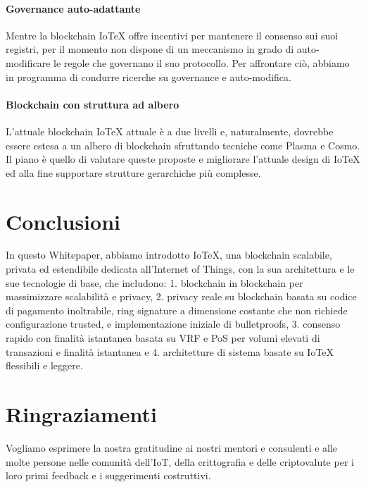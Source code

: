 \paragraph{Governance auto-adattante}
Mentre la blockchain IoTeX offre incentivi per mantenere il consenso sui suoi registri, per il momento non dispone di un meccanismo in grado di auto-modificare le regole che governano il suo protocollo. Per affrontare ciò, abbiamo in programma di condurre ricerche su governance e auto-modifica.

\paragraph{Blockchain con struttura ad albero}
L'attuale blockchain IoTeX attuale è a due livelli e, naturalmente, dovrebbe essere estesa a un albero di blockchain sfruttando tecniche come Plasma e Cosmo. Il piano è quello di valutare queste proposte e migliorare l'attuale design di IoTeX ed alla fine supportare strutture gerarchiche più complesse.

\section{Conclusioni}
In questo Whitepaper, abbiamo introdotto IoTeX, una blockchain scalabile, privata ed estendibile dedicata all'Internet of Things, con la sua architettura e le sue tecnologie di base, che includono:
1. blockchain in blockchain per massimizzare scalabilità e privacy, 2. privacy reale su blockchain basata su codice di pagamento inoltrabile, ring signature a dimensione costante che non richiede configurazione trusted, e implementazione iniziale di bulletproofs, 3. consenso rapido con finalità istantanea basata su VRF e PoS per volumi elevati di transazioni e finalità istantanea e 4. architetture di sistema basate su IoTeX flessibili e leggere.

\section{Ringraziamenti}
Vogliamo esprimere la nostra gratitudine ai nostri mentori e consulenti e alle molte persone nelle comunità dell'IoT, della crittografia e delle criptovalute per i loro primi feedback e i suggerimenti costruttivi.
